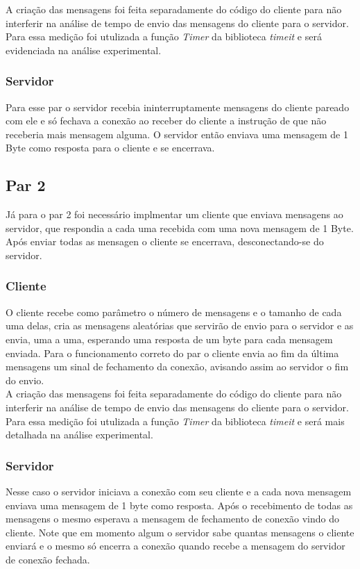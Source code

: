 \documentclass[12pt]{article}
\begin{document}
A criação das mensagens foi feita separadamente do código do cliente para não interferir na análise de tempo
de envio das mensagens do cliente para o servidor.
Para essa medição foi utulizada a função \textit{Timer} da biblioteca \textit{timeit} e será evidenciada na análise experimental.


\subsubsection{Servidor}
Para esse par o servidor recebia ininterruptamente mensagens do cliente pareado com ele
e só fechava a conexão ao receber do cliente a instrução de que não receberia mais mensagem alguma.
O servidor então enviava uma mensagem de 1 Byte como resposta para o cliente e se encerrava.

\subsection{Par 2}
Já para o par 2 foi necessário implmentar um cliente que enviava mensagens ao servidor,
que respondia a cada uma recebida com uma nova mensagem de 1 Byte.
Após enviar todas as mensagen o cliente se encerrava, desconectando-se do servidor.

\subsubsection{Cliente}
O cliente recebe como parâmetro o número de mensagens e o tamanho de cada uma delas,
cria as mensagens aleatórias que servirão de envio para o servidor e as envia, uma a uma,
esperando uma resposta de um byte para cada mensagem enviada.
Para o funcionamento correto do par o cliente envia ao fim da última mensagens um sinal de fechamento da conexão,
avisando assim ao servidor o fim do envio.\\

A criação das mensagens foi feita separadamente do código do cliente para não interferir na análise de tempo
de envio das mensagens do cliente para o servidor.
Para essa medição foi utulizada a função \textit{Timer} da biblioteca \textit{timeit} e será mais detalhada na análise experimental.

\subsubsection{Servidor}
Nesse caso o servidor iniciava a conexão com seu cliente e a cada nova mensagem enviava uma mensagem de 1 byte como resposta.
Após o recebimento de todas as mensagens o mesmo esperava a mensagem de fechamento de conexão vindo do cliente.
Note que em momento algum o servidor sabe quantas mensagens o cliente enviará e o mesmo só encerra a conexão
quando recebe a mensagem do servidor de conexão fechada.
\end{document}

